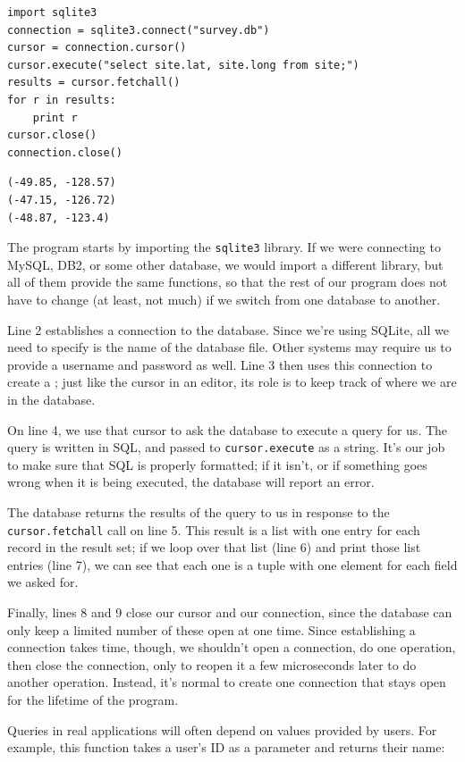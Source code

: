 \documentclass{book}
\begin{document}
\begin{verbatim}
import sqlite3
connection = sqlite3.connect("survey.db")
cursor = connection.cursor()
cursor.execute("select site.lat, site.long from site;")
results = cursor.fetchall()
for r in results:
    print r
cursor.close()
connection.close()
\end{verbatim}

\begin{verbatim}
(-49.85, -128.57)
(-47.15, -126.72)
(-48.87, -123.4)
\end{verbatim}

The program starts by importing the \texttt{sqlite3} library. If we were
connecting to MySQL, DB2, or some other database, we would import a
different library, but all of them provide the same functions, so that
the rest of our program does not have to change (at least, not much) if
we switch from one database to another.

Line 2 establishes a connection to the database. Since we're using
SQLite, all we need to specify is the name of the database file. Other
systems may require us to provide a username and password as well. Line
3 then uses this connection to create a ;
just like the cursor in an editor, its role is to keep track of where we
are in the database.

On line 4, we use that cursor to ask the database to execute a query for
us. The query is written in SQL, and passed to \texttt{cursor.execute}
as a string. It's our job to make sure that SQL is properly formatted;
if it isn't, or if something goes wrong when it is being executed, the
database will report an error.

The database returns the results of the query to us in response to the
\texttt{cursor.fetchall} call on line 5. This result is a list with one
entry for each record in the result set; if we loop over that list (line
6) and print those list entries (line 7), we can see that each one is a
tuple with one element for each field we asked for.

Finally, lines 8 and 9 close our cursor and our connection, since the
database can only keep a limited number of these open at one time. Since
establishing a connection takes time, though, we shouldn't open a
connection, do one operation, then close the connection, only to reopen
it a few microseconds later to do another operation. Instead, it's
normal to create one connection that stays open for the lifetime of the
program.

Queries in real applications will often depend on values provided by
users. For example, this function takes a user's ID as a parameter and
returns their name:
\end{document}

